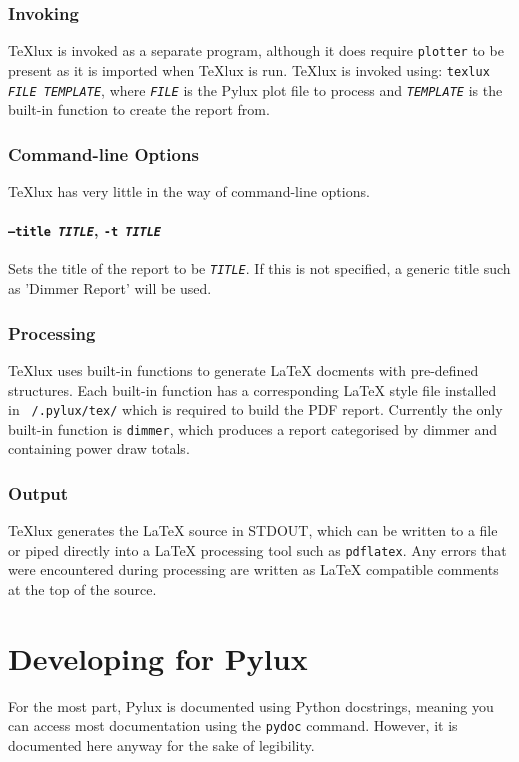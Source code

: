 \documentclass[a4paper]{article}
\begin{document}
\subsubsection{Invoking}
TeXlux is invoked as a separate program, although it does require 
\texttt{plotter} to be present as it is imported when TeXlux is run. TeXlux is 
invoked using: \texttt{texlux \textit{FILE} \textit{TEMPLATE}}, where 
\texttt{\textit{FILE}} is the Pylux plot file to process and 
\texttt{\textit{TEMPLATE}} is the built-in function to create the report from.

\subsubsection{Command-line Options}
TeXlux has very little in the way of command-line options.

\paragraph{\texttt{--title \textit{TITLE}}, \texttt{-t \textit{TITLE}}}
Sets the title of the report to be \texttt{\textit{TITLE}}. If this is not 
specified, a generic title such as 'Dimmer Report' will be used.

\subsubsection{Processing}

TeXlux uses built-in functions to generate \LaTeX{} docments with pre-defined 
structures. Each built-in function has a corresponding \LaTeX{} style file 
installed in \texttt{~/.pylux/tex/} which is required to build the PDF report. 
Currently the only built-in function is \texttt{dimmer}, which produces a 
report categorised by dimmer and containing power draw totals.

\subsubsection{Output}

TeXlux generates the \LaTeX{} source in STDOUT, which can be written to a 
file or piped directly into a \LaTeX{} processing tool such as 
\texttt{pdflatex}. Any errors that were encountered during processing are 
written as \LaTeX{} compatible comments at the top of the source.

\section{Developing for Pylux}
For the most part, Pylux is documented using Python docstrings, meaning you 
can access most documentation using the \texttt{pydoc} command. However, it 
is documented here anyway for the sake of legibility.
\end{document}
